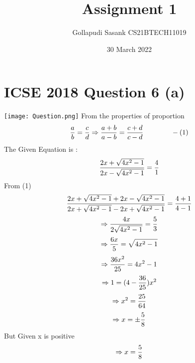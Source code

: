\documentclass{article}
\title{Assignment 1}
\author{Gollapudi Sasank CS21BTECH11019}
\date{30 March 2022}
\begin{document}
\maketitle
\section*{ICSE 2018 Question 6 (a)}
\texttt{[image: Question.png]}
From the properties of proportion \\ 
\begin{equation*}
     \frac{a}{b}  =  \frac{c}{d} 
     \Rightarrow 
     \frac{a+b}{a-b} = \frac{c+d}{c-d} \hspace{40pt} -(1) \\
\end{equation*}
The Given Equation is :
    \begin{equation*}
    \centering
        \frac{2x+\sqrt{4x^2-1}}{2x-\sqrt{4x^2-1}} = \frac {4}{1}
    \end{equation*}
    From (1) 
\begin{equation*}
        \frac {2x+\sqrt{4x^2-1}+2x-\sqrt{4x^2-1}}{2x+\sqrt{4x^2-1}-2x+\sqrt{4x^2-1}} = \frac {4+1}{4-1} \\
\end{equation*}
\begin{equation*}
        \Rightarrow
        \frac{4x}{2\sqrt{4x^2-1}} = \frac {5}{3} \\
\end{equation*}
\begin{equation*}
        \Rightarrow
        \frac{6x}{5} = \sqrt{4x^2-1} \\
\end{equation*}
\begin{equation*}
    \Rightarrow
        \frac{36x^2}{25} = 4x^2-1 \\
\end{equation*}
\begin{equation*}
        \Rightarrow
        1 = (4 - \frac{36}{25} )  x^2 \\
\end{equation*}
\begin{equation*}
    \Rightarrow
    x^2 =\frac{25}{64} \\ 
\end{equation*}
\begin{equation*}
    \Rightarrow
    x = \pm\frac{5}{8} \\
\end{equation*}
But Given x is positive 
\begin{equation*}
  \Rightarrow x = \frac{5}{8} \\  
\end{equation*}
\end{document}
